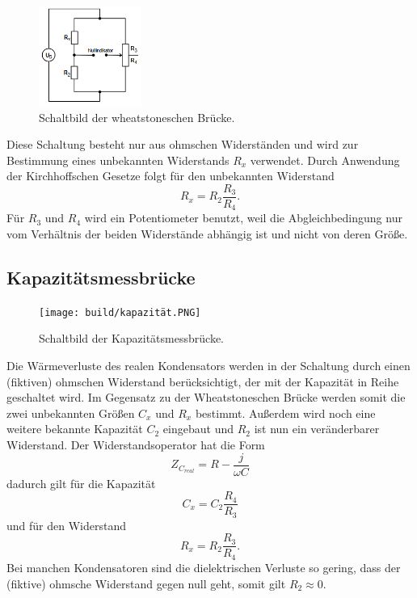 \begin{figure}[H]
    \centering
    \includegraphics[width=0.3\textwidth]{build/wheat.PNG}
    \caption{Schaltbild der wheatstoneschen Brücke.\cite[219]{V302}}
    \label{fig:wheat}
\end{figure}
Diese Schaltung besteht nur aus ohmschen Widerständen und wird zur Bestimmung eines unbekannten Widerstands $R_x$ verwendet.
Durch Anwendung der Kirchhoffschen Gesetze folgt für den unbekannten Widerstand
\begin{equation}
    R_x = R_2 \frac{R_3}{R_4}.
    \label{eqn:wheat}
\end{equation}
Für $R_3$ und $R_4$ wird ein Potentiometer benutzt, weil die Abgleichbedingung nur vom Verhältnis der beiden Widerstände abhängig ist und nicht von deren Größe.

\subsection{Kapazitätsmessbrücke}
\label{subsec:kapazitäts}

\begin{figure}[H]
    \centering
    \texttt{[image: build/kapazität.PNG]}
    \caption{Schaltbild der Kapazitätsmessbrücke.\cite[220]{V302}}
    \label{fig:kapazität}
\end{figure}
Die Wärmeverluste des realen Kondensators werden in der Schaltung durch einen (fiktiven) ohmschen Widerstand berücksichtigt, der mit der Kapazität in Reihe geschaltet wird.
Im Gegensatz zu der Wheatstoneschen Brücke werden somit die zwei unbekannten Größen $C_x$ und $R_x$ bestimmt.
Außerdem wird noch eine weitere bekannte Kapazität $C_2$ eingebaut und $R_2$ ist nun ein veränderbarer Widerstand.
Der Widerstandsoperator hat die Form
\begin{equation}
    Z_{C_{real}} = R - \frac{j}{\omega C}
    \label{eqn:widerop_kap}
\end{equation}
dadurch gilt für die Kapazität
\begin{equation}
    C_x = C_2 \frac{R_4}{R_3}
    \label{eqn:kapazität_kap}
\end{equation}
und für den Widerstand
\begin{equation}
    R_x = R_2 \frac{R_3}{R_4}.
    \label{eqn:widerstand_kap}
\end{equation}
Bei manchen Kondensatoren sind die dielektrischen Verluste so gering, dass der (fiktive) ohmsche Widerstand gegen null geht, somit gilt $R_2 \approx 0$.


